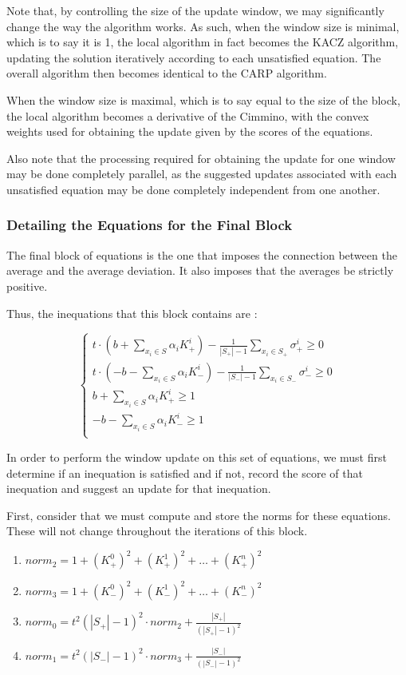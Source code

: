 \documentclass[a4paper,twoside,10pt]{report}
\begin{document}
	Note that, by controlling the size of the update window, we may significantly change the way the algorithm works. 
	As such, when the window size is minimal, which is to say it is 1, the local algorithm in fact becomes the KACZ algorithm, 
updating the solution iteratively according to each unsatisfied equation. The overall algorithm then becomes identical to the CARP algorithm.

	When the window size is maximal, which is to say equal to the size of the block, the local algorithm becomes a derivative of the Cimmino, 
with the convex weights used for obtaining the update given by the scores of the equations.

	Also note that the processing required for obtaining the update for one window may be done completely parallel, as the suggested updates 
associated with each unsatisfied equation may be done completely independent from one another. 
	
	\subsubsection{Detailing the Equations for the Final Block}
	
	The final block of equations is the one that imposes the connection between the average and the average deviation. It also imposes that the averages be strictly positive.
	
	Thus, the inequations that this block contains are : 
	
	\[\left\{
		\begin{array}{l}
				t \cdot (b + \sum_{x_i\in S}{\alpha_i K^i_+}) - \frac{1}{|S_+| - 1} \sum_{x_i\in S_+} {\sigma_+^i} \geq 0\\
				t \cdot (- b - \sum_{x_i\in S}{\alpha_i K^i_-}) - \frac{1}{|S_-| - 1} \sum_{x_i\in S_-} {\sigma_-^i} \geq 0\\
				b + \sum_{x_i\in S}{\alpha_i K^i_+} \geq 1\\
				- b - \sum_{x_i\in S}{\alpha_i K^i_-} \geq 1\\	
		\end{array} \right.
	\]
	
	In order to perform the window update on this set of equations, we must first determine if an inequation is satisfied and if not, record the score of that inequation and suggest an update for that inequation.
	
	First, consider that we must compute and store the norms for these equations. These will not change throughout the iterations of this block.
	\begin{enumerate}
		\item \(norm_2 = 1 + (K_+^0)^2 + (K_+^1)^2 + \ldots + (K_+^n)^2\)
		\item \(norm_3 = 1 + (K_-^0)^2 + (K_-^1)^2 + \ldots + (K_-^n)^2\)
		\item \(norm_0 = t^2(|S_+| - 1)^2 \cdot norm_2 + \frac{|S_+|}{(|S_+| - 1)^2}\)
		\item \(norm_1 = t^2(|S_-| - 1)^2 \cdot norm_3 + \frac{|S_-|}{(|S_-| - 1)^2}\)
		
	\end{enumerate}
	
\end{document}
